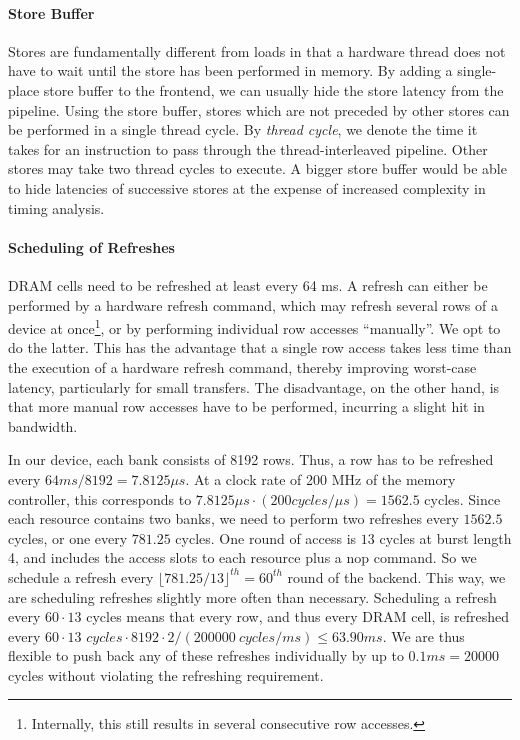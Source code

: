 \paragraph{Store Buffer}
Stores are fundamentally different from loads in that a hardware thread does not have to wait until the store has been performed in memory.
By adding a single-place store buffer to the frontend, we can usually hide the store latency from the pipeline.
Using the store buffer, stores which are not preceded by other stores can be performed in a single thread cycle.
By \emph{thread cycle}, we denote the time it takes for an instruction to pass through the thread-interleaved pipeline.
Other stores may take two thread cycles to execute.
A bigger store buffer would be able to hide latencies of successive stores at the expense of increased complexity in timing analysis.


\paragraph{Scheduling of Refreshes}
DRAM cells need to be refreshed at least every 64 ms.
A refresh can either be performed by a hardware refresh command, which may refresh several rows of a device at once\footnote{Internally, this still results in several consecutive row accesses.}, or by performing individual row accesses ``manually''.
We opt to do the latter.
This has the advantage  that a single row access takes less time than the execution of a hardware refresh command, thereby improving worst-case latency, particularly for small transfers.
The disadvantage, on the other hand,  is that more manual row accesses have to be performed, incurring a slight hit in bandwidth.

In our device, each bank consists of 8192 rows.
Thus, a row has to be refreshed every $64\textit{ms}/8192=7.8125 {\mu}s$.
At a clock rate of 200 MHz of the memory controller, this corresponds to $7.8125 {\mu}s \cdot (200 \textit{cycles}/{\mu}s) = 1562.5$ cycles.
Since each resource contains two banks, we need to perform two refreshes every $1562.5$ cycles, or one every $781.25$ cycles.
One round of access is $13$ cycles at burst length 4, and includes the access slots to each resource plus a nop command. 
So we schedule a refresh every $\lfloor 781.25/13 \rfloor^{th} = 60^{th}$ round of the backend.
This way, we are scheduling refreshes slightly more often than necessary.
Scheduling a refresh every $60 \cdot 13$ cycles means that every row, and thus every DRAM cell, is refreshed every $60\cdot 13 \textit{ cycles}\cdot 8192\cdot 2/(200000~\textit{cycles}/\textit{ms}) \leq 63.90\textit{ms}$.
We are thus flexible to push back any of these refreshes individually by up to $0.1\textit{ms} = 20000$ cycles without violating the refreshing requirement.

